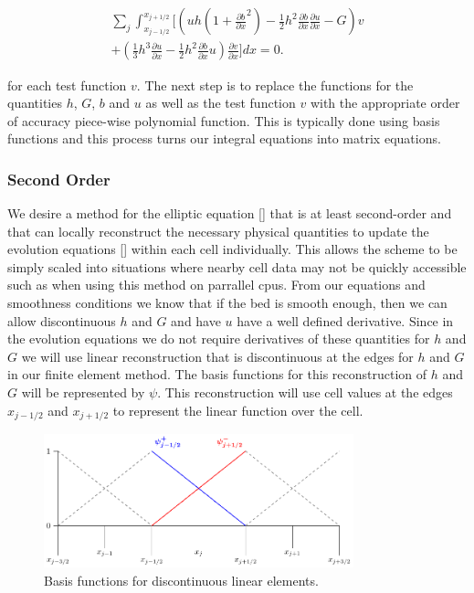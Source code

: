 \begin{multline}
\label{eq:elementwiseint}
 \sum_{j}  \int_{x_{j-1/2} }^{{x_{j+1/2}}} \Bigg[  \left( uh \left(1 + \frac{\partial b}{\partial x}^2 \right)  - \frac{1}{2}h^2\frac{\partial b}{\partial x}  \frac{\partial u }{\partial x}  -  G \right) v   \\ +  \left( \frac{1}{3}h^3  \frac{\partial {u}}{\partial x}    -     \frac{1}{2}h^2\frac{\partial b}{\partial x} u    \right) \frac{\partial v }{\partial x} \Bigg]dx  = 0.
\end{multline}

for each test function $v$. The next step is to replace the functions for the quantities $h$, $G$, $b$ and $u$ as well as the test function $v$ with the appropriate order of accuracy piece-wise polynomial function. This is typically done using basis functions and this process turns our integral equations into matrix equations.

\subsubsection{Second Order}
We desire a method for the elliptic equation [] that is at least second-order and that can locally reconstruct the necessary physical quantities to update the evolution equations [] within each cell individually. This allows the scheme to be simply scaled into situations where nearby cell data may not be quickly accessible such as when using this method on parrallel cpus. From our equations and smoothness conditions we know that if the bed is smooth enough, then we can allow discontinuous $h$ and $G$ and have $u$ have a well defined derivative. Since in the evolution equations we do not require derivatives of these quantities for $h$ and $G$ we will use linear reconstruction that is discontinuous at the edges for $h$ and $G$ in our finite element method. The basis functions for this reconstruction of $h$ and $G$ will be represented by $\psi$. This reconstruction will use cell values at the edges $x_{j-1/2}$ and $x_{j + 1/2}$ to represent the linear function over the cell.

\begin{figure}
	\centering
	\includegraphics[width=0.8\textwidth]{./chp3/figures/P1.pdf}
	\caption{Basis functions for discontinuous linear elements.}
	\label{fig:P1DiscBasis}
\end{figure}



